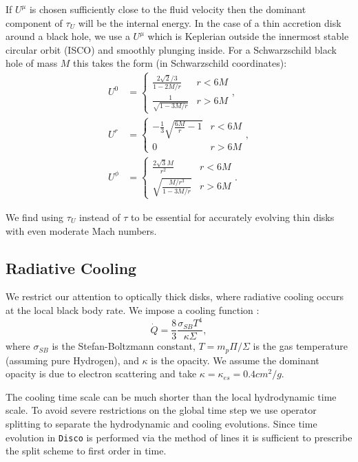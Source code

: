 \documentclass{emulateapj}
\newcommand{\sig}{\sigma}
\newcommand{\Sig}{\Sigma}
\newcommand{\ka}{\kappa}
\newcommand{\Disco}{{\texttt{Disco}}}
\begin{document}
If $U^\mu$ is chosen sufficiently close to the fluid velocity then the dominant component of $\tau_U$ will be the internal energy.  In the case of a thin accretion disk around a black hole, we use a $U^\mu$ which is Keplerian outside the innermost stable circular orbit (ISCO) and smoothly plunging inside.  For a Schwarzschild black hole of mass $M$ this takes the form (in Schwarzschild coordinates):
\begin{align}
	U^0 &= \left \{ \begin{matrix} \frac{2\sqrt{2}/3}{1-2M/r} & r < 6M \\
						\frac{1}{\sqrt{1-3M/r}} & r > 6M \end{matrix} \right . , \nonumber \\
	U^r &= \left \{ \begin{matrix} -\frac{1}{3}\sqrt{\frac{6M}{r}-1} & r < 6M \\
						0 & r > 6M \end{matrix} \right . , \nonumber \\
	U^\phi &= \left \{ \begin{matrix}  \frac{2 \sqrt{3} M}{r^2} & r < 6M \\
						\sqrt{\frac{M/r^3}{1-3M/r}} & r > 6M \end{matrix} \right . . \label{eq:Ugeo}
\end{align}


We find using $\tau_U$ instead of $\tau$ to be essential for accurately evolving thin disks with even moderate Mach numbers.

\subsection{Radiative Cooling}
\label{subsec:cooling}

We restrict our attention to optically thick disks, where radiative cooling occurs at the local black body rate. We impose a cooling function \citep{Novikov73, FrankKingRaine}:
\begin{equation}
	\dot{Q} = \frac{8}{3} \frac{\sig_{SB} T^4}{\ka \Sig} , \label{eq:BBcooling}
\end{equation}
where $\sig_{SB}$ is the Stefan-Boltzmann constant, $T = m_p \Pi / \Sig$ is the gas temperature (assuming pure Hydrogen), and $\ka $ is the opacity.  We assume the dominant opacity is due to electron scattering and take $\ka = \ka_{es} = 0.4 cm^2/g$.

The cooling time scale can be much shorter than the local hydrodynamic time scale.  To avoid severe restrictions on the global time step we use operator splitting to separate the hydrodynamic and cooling evolutions.  Since time evolution in \Disco{} is performed via the method of lines it is sufficient to prescribe the split scheme to first order in time.
\end{document}
